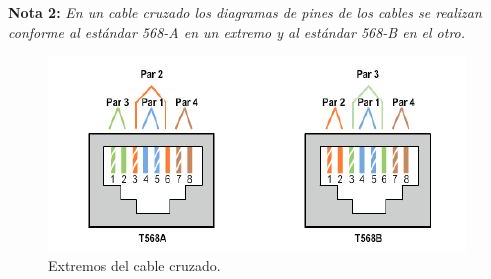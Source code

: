 \documentclass[journal]{IEEEtran}
\begin{document}
\textbf{Nota 2:}
\textit{En un cable cruzado los diagramas de pines de los cables se realizan conforme al estándar 568-A en un extremo y al estándar 568-B en el otro.}
\begin{center}
\begin{figure}[H]
\centering
\includegraphics[scale=0.75]{7.JPG} 
\caption{Extremos del cable cruzado.}
\end{figure}
\end{center}
\end{document}

